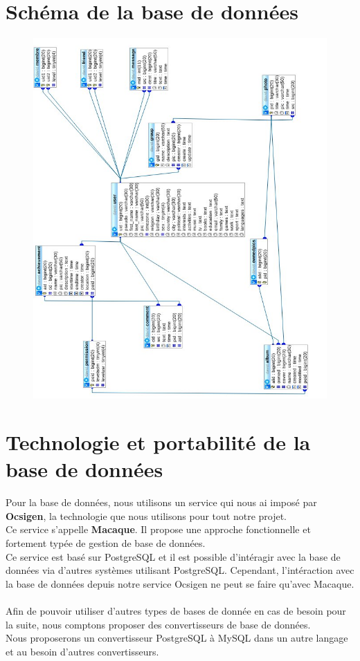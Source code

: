 \documentclass{life-fr}
\begin{document}
\section{Schéma de la base de données}

\begin{figure}[H]
  \begin{center}
    \includegraphics[width=18cm]{img/imgdb.jpg}
  \end{center}
\end{figure}

\section{Technologie et portabilité de la base de données}

Pour la base de données, nous utilisons un service qui nous ai imposé par
\textbf{Ocsigen}, la technologie que nous utilisons pour tout notre projet.\\
Ce service s'appelle \textbf{Macaque}. Il propose une approche fonctionnelle
et fortement typée de gestion de base de données.\\
Ce service est basé sur PostgreSQL et il est possible d'intéragir avec la
base de données via d'autres systèmes utilisant PostgreSQL.
Cependant, l'intéraction avec la base de données depuis notre service Ocsigen
ne peut se faire qu'avec Macaque.\\
\\
Afin de pouvoir utiliser d'autres types de bases de donnée en cas de besoin
pour la suite, nous comptons proposer des convertisseurs de base de données.\\
Nous proposerons un convertisseur PostgreSQL à MySQL dans un autre langage et
au besoin d'autres convertisseurs.
\end{document}
